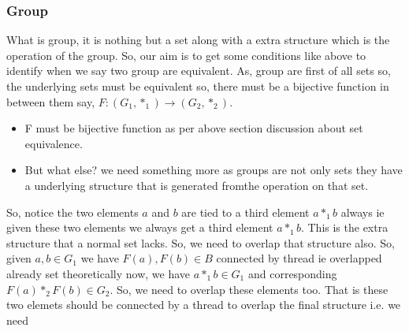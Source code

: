 \documentclass{article}
\begin{document}
\subsubsection{Group}
What is group, it is nothing but a set along with a extra structure which is the operation of the group. So, our aim is to get some conditions like above to identify when we say two group are equivalent. As, group are first of all sets so, the underlying sets must be equivalent so, there must be a bijective function in between them say, $F:(G_1,*_1)\rightarrow (G_2,*_2)$.

\begin{itemize}
    \item F must be bijective function as per above section discussion about set equivalence.
    \item But what else? we need something more as groups are not only sets they have a underlying structure that is generated fromthe operation on that set.
\end{itemize}

\begin{center}
\end{center}

So, notice the two elements $a$ and $b$ are tied to a third element $a*_1b$ always ie given these two elements we always get a third element $a*_1b$.
This is the extra structure that a normal set lacks. So, we need to overlap that structure also. So, given $a,b\in G_1$ we have $F(a),F(b)\in B$ connected by thread ie overlapped already set theoretically now, we have $a*_1b\in G_1$ and corresponding $F(a)*_2F(b)\in G_2$. So, we need to overlap these elements too. That is these two elemets should be connected by a thread to overlap the final structure i.e. we need 
\end{document}
